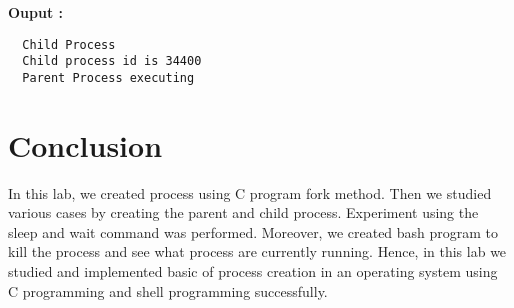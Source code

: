 \documentclass[journal,onecolumn]{IEEEtran}
\begin{document}
\textbf{Ouput : }
\begin{verbatim}
  Child Process 
  Child process id is 34400
  Parent Process executing
\end{verbatim}

\section{Conclusion}
In this lab, we created process using C program fork method. Then we studied various cases  by creating the parent and child process. Experiment using the sleep and wait command was performed. Moreover, we created bash program to kill the process and see what process are currently running. Hence, in this lab we studied and implemented basic of process creation in an operating system using C programming and shell programming successfully.
\end{document}
